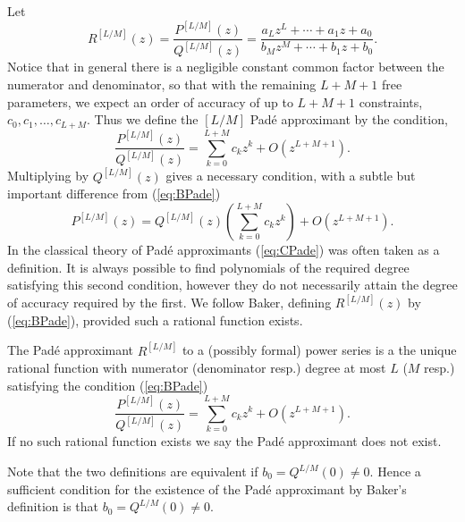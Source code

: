 Let
\[
  R^{[L/M]}(z) = \frac{P^{[L/M]}(z)}{Q^{[L/M]}(z)} = \frac{a_L z^L + \cdots + a_1z + a_0}{b_M z^M + \cdots + b_1z + b_0}.
\]
Notice that in general there is a negligible constant common factor between the numerator and denominator, so that with the remaining $L+M+1$ free parameters, we expect an order of accuracy of up to $L+M+1$ constraints, $c_0, c_1, \ldots, c_{L+M}$. Thus we define the $[L/M]$ Pad\'e approximant by the condition,
\begin{equation}
  \label{eq:BPade}
  \frac{P^{[L/M]}(z)}{Q^{[L/M]}(z)} = \sum_{k=0}^{L+M} c_k z^k + O\left(z^{L+M+1}\right).
\end{equation}
Multiplying by $Q^{[L/M]}(z)$ gives a necessary condition, with a subtle but important difference from (\ref{eq:BPade})
\begin{equation}
  \label{eq:CPade}
  P^{[L/M]}(z) = Q^{[L/M]}(z)\left(\sum_{k=0}^{L+M} c_k z^k\right) + O\left(z^{L+M+1}\right).
\end{equation}
In the classical theory of Pad\'e approximants (\ref{eq:CPade}) was often taken as a definition. It is always possible to find polynomials of the required degree satisfying this second condition, however they do not necessarily attain the degree of accuracy required by the first. We follow Baker, defining $R^{[L/M]}(z)$ by (\ref{eq:BPade}), provided such a rational function exists.

\begin{definition}
  The Pad\'e approximant $R^{[L/M]}$ to a (possibly formal) power series is a the unique rational function with numerator (denominator resp.) degree at most $L$ ($M$ resp.) satisfying the condition 
  (\ref{eq:BPade})
  \[
  \frac{P^{[L/M]}(z)}{Q^{[L/M]}(z)} = \sum_{k=0}^{L+M} c_k z^k + O\left(z^{L+M+1}\right).
  \] 
  If no such rational function exists we say the Pad\'e approximant does not exist.
\end{definition}

Note that the two definitions are equivalent if $b_0 = Q^{L/M}(0) \neq 0$. Hence a sufficient condition for the existence of the Pad\'e approximant by Baker's definition is that $b_0 = Q^{L/M}(0) \neq 0$. 

